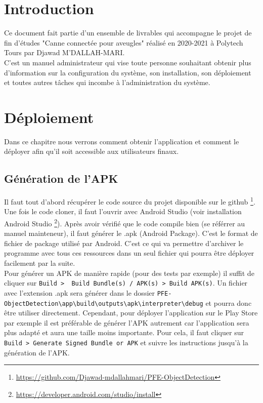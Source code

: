 \documentclass[UTF8]{EPURapport}
\begin{document}
\chapter{Introduction}

Ce document fait partie d'un ensemble de livrables qui accompagne le projet de fin d'études "Canne connectée pour aveugles" réalisé en 2020-2021 à Polytech Tours par Djawad M'DALLAH-MARI.\\

C'est un manuel administrateur qui vise toute personne souhaitant obtenir plus d'information sur la configuration du système, son installation, son déploiement et toutes autres tâches qui incombe à l'administration du système.

\chapter{Déploiement}
Dans ce chapitre nous verrons comment obtenir l'application et comment le déployer afin qu'il soit accessible aux utilisateurs finaux.

\section{Génération de l'APK}\label{genapk}

Il faut tout d'abord récupérer le code source du projet disponible sur le github \footnote{\url{https://github.com/Djawad-mdallahmari/PFE-ObjectDetection}}. Une fois le code cloner, il faut l'ouvrir avec Android Studio (voir installation Android Studio \footnote{\url{https://developer.android.com/studio/install}}). Après avoir vérifié que le code compile bien (se référrer au manuel mainteneur), il faut générer le .apk (Android Package). C'est le format de fichier de package utilisé par Android. C'est ce qui va permettre d'archiver le programme avec tous ces ressources dans un seul fichier qui pourra être déployer facilement par la suite.\\
Pour générer un APK de manière rapide (pour des tests par exemple) il suffit de cliquer sur \verb|Build >  Build Bundle(s) / APK(s) > Build APK(s)|. Un fichier avec l'extension .apk sera générer dans le dossier \verb|PFE-ObjectDetection\app\build\outputs\apk\interpreter\debug| et pourra donc être utiliser directement. Cependant, pour déployer l'application sur le Play Store par exemple il est préférable de générer l'APK autrement car l'application sera plus adapté et aura une taille moins importante. Pour cela, il faut cliquer sur \verb|Build > Generate Signed Bundle or APK| et suivre les instructions jusqu'à la génération de l'APK.
\end{document}
